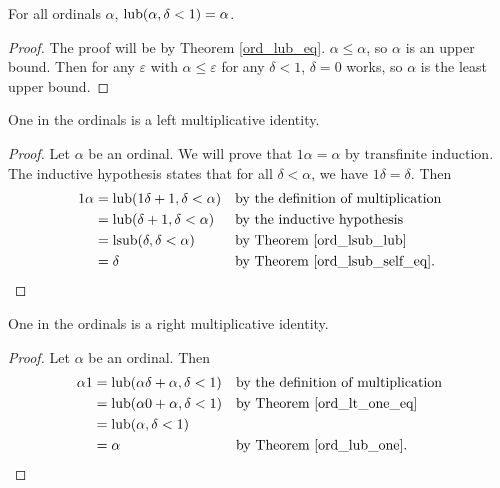 \documentclass[../../math.tex]{subfiles}
\begin{document}
\begin{theorem} \label{ord_lub_one}
    For all ordinals $\alpha$, $\operatorname{lub}(\alpha, \delta < 1) = \alpha$.
\end{theorem}
\begin{proof}
    The proof will be by Theorem \ref{ord_lub_eq}.  $\alpha \leq \alpha$, so
    $\alpha$ is an upper bound.  Then for any $\varepsilon$ with $\alpha \leq
    \varepsilon$ for any $\delta < 1$, $\delta = 0$ works, so $\alpha$ is the
    least upper bound.
\end{proof}

\begin{instance}
    One in the ordinals is a left multiplicative identity.
\end{instance}
\begin{proof}
    Let $\alpha$ be an ordinal.  We will prove that $1\alpha = \alpha$ by
    transfinite induction.  The inductive hypothesis states that for all $\delta
    < \alpha$, we have $1\delta = \delta$.  Then
    \begin{align*}
        1\alpha
        &= \operatorname{lub}(1\delta + 1, \delta < \alpha)
            && \text{by the definition of multiplication} \\
        &= \operatorname{lub}(\delta + 1, \delta < \alpha)
            && \text{by the inductive hypothesis} \\
        &= \operatorname{lsub}(\delta, \delta < \alpha)
            && \text{by Theorem \ref{ord_lsub_lub}} \\
        &= \delta
            && \text{by Theorem \ref{ord_lsub_self_eq}.} \\
    \end{align*}
\end{proof}

\begin{instance}
    One in the ordinals is a right multiplicative identity.
\end{instance}
\begin{proof}
    Let $\alpha$ be an ordinal.  Then
    \begin{align*}
        \alpha1
        &= \operatorname{lub}(\alpha \delta + \alpha, \delta < 1)
            && \text{by the definition of multiplication} \\
        &= \operatorname{lub}(\alpha 0 + \alpha, \delta < 1)
            && \text{by Theorem \ref{ord_lt_one_eq}} \\
        &= \operatorname{lub}(\alpha, \delta < 1) && \\
        &= \alpha
            && \text{by Theorem \ref{ord_lub_one}.} \\
    \end{align*}
\end{proof}
\end{document}
